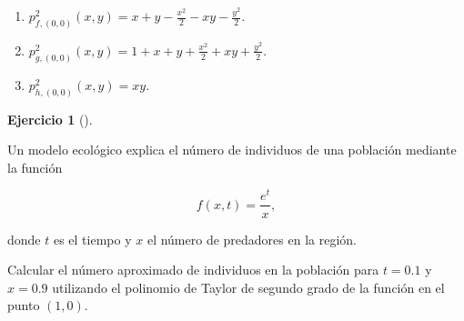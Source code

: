 \documentclass[
  a4paper,
]{scrreport}
\theoremstyle{definition}
\newtheorem{exercise}{Ejercicio}[chapter]
\theoremstyle{remark}
\begin{document}
\begin{tcolorbox}[enhanced jigsaw, left=2mm, coltitle=black, colbacktitle=quarto-callout-tip-color!10!white, opacitybacktitle=0.6, colback=white, breakable, titlerule=0mm, toptitle=1mm, rightrule=.15mm, bottomtitle=1mm, bottomrule=.15mm, toprule=.15mm, leftrule=.75mm, arc=.35mm, opacityback=0, title=\textcolor{quarto-callout-tip-color}{\faLightbulb}\hspace{0.5em}{Solución}, colframe=quarto-callout-tip-color-frame]

\begin{enumerate}
\def\labelenumi{\alph{enumi}.}
\item
  \(p^2_{f,(0,0)}(x,y) = x + y -\frac{x^2}{2} - xy -\frac{y^2}{2}\).
\item
  \(p^2_{g,(0,0)}(x,y) = 1 + x + y +\frac{x^2}{2} + xy +\frac{y^2}{2}\).
\item
  \(p^2_{h,(0,0)}(x,y) = xy\).
\end{enumerate}

\end{tcolorbox}

\begin{exercise}[]\protect\hypertarget{exr-polinomio-taylor-modelo-ecologico}{}\label{exr-polinomio-taylor-modelo-ecologico}

Un modelo ecológico explica el número de individuos de una población
mediante la función

\[f(x,t)=\dfrac{e^t}{x},\]

donde \(t\) es el tiempo y \(x\) el número de predadores en la región.

Calcular el número aproximado de individuos en la población para
\(t=0.1\) y \(x=0.9\) utilizando el polinomio de Taylor de segundo grado
de la función en el punto \((1,0)\).

\end{exercise}
\end{document}
